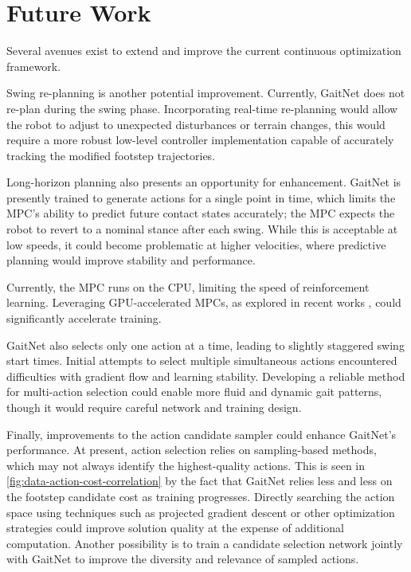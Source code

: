 \section{Future Work}
\label{sec:conclusions-future-work}

Several avenues exist to extend and improve the current continuous
optimization framework.

Swing re-planning is another potential improvement. Currently,
GaitNet does not re-plan during the swing phase. Incorporating
real-time re-planning would allow the robot to adjust to unexpected
disturbances or terrain changes, this would require a more
robust low-level controller implementation capable of accurately tracking the
modified footstep trajectories.

Long-horizon planning also presents an opportunity for enhancement.
GaitNet is presently trained to generate actions for a single point
in time, which limits the MPC's ability to predict future contact
states accurately; the MPC expects the robot to revert to a nominal
stance after each swing. While this is acceptable at low speeds, it
could become problematic at higher velocities, where predictive
planning would improve stability and performance.

Currently, the MPC runs on the CPU, limiting the speed of
reinforcement learning. Leveraging GPU-accelerated MPCs, as explored
in recent works \cite{bishop_relu_2023, Plancher22Dissertation},
could significantly accelerate training.

GaitNet also selects only one action at a time, leading to slightly
staggered swing start times. Initial attempts to select multiple
simultaneous actions encountered difficulties with gradient flow and
learning stability. Developing a reliable method for multi-action
selection could enable more fluid and dynamic gait patterns, though
it would require careful network and training design.

Finally, improvements to the action candidate sampler could enhance
GaitNet's performance. At present, action selection relies on
sampling-based methods, which may not always identify the
highest-quality actions. This is seen in
\autoref{fig:data-action-cost-correlation} by the fact that GaitNet
relies less and less on the footstep candidate cost as training
progresses. Directly searching the action space using techniques such
as projected gradient descent or other optimization strategies could
improve solution quality at the expense of additional computation.
Another possibility is to train a candidate selection network jointly
with GaitNet to improve the diversity and relevance of sampled actions.
